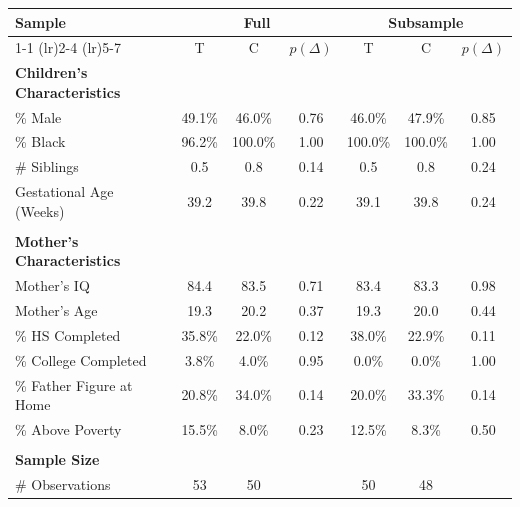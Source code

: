 \begin{tabular}{lcccccc}
\toprule 
\midrule 
Sample & \multicolumn{3}{c}{Full} & \multicolumn{3}{c}{Subsample} \\
 \cmidrule(lr){1-1} \cmidrule(lr){2-4} \cmidrule(lr){5-7} 
 & T & C & $p(\Delta)$ & T & C & $p(\Delta)$ \\
\midrule 
\textbf{Children's Characteristics} \\
\quad \% Male & 49.1\% & 46.0\% & 0.76 & 46.0\% & 47.9\% & 0.85 \\
\quad \% Black & 96.2\% & 100.0\% & 1.00 & 100.0\% & 100.0\% & 1.00 \\
\quad \# Siblings & 0.5 & 0.8 & 0.14 & 0.5 & 0.8 & 0.24 \\
\quad Gestational Age (Weeks) & 39.2 & 39.8 & 0.22 & 39.1 & 39.8 & 0.24 \\
 \\
\textbf{Mother's Characteristics} \\
\quad Mother's IQ & 84.4 & 83.5 & 0.71 & 83.4 & 83.3 & 0.98 \\
\quad Mother's Age & 19.3 & 20.2 & 0.37 & 19.3 & 20.0 & 0.44 \\
\quad \% HS Completed & 35.8\% & 22.0\% & 0.12 & 38.0\% & 22.9\% & 0.11 \\
\quad \% College Completed & 3.8\% & 4.0\% & 0.95 & 0.0\% & 0.0\% & 1.00 \\
\quad \% Father Figure at Home & 20.8\% & 34.0\% & 0.14 & 20.0\% & 33.3\% & 0.14 \\
\quad \% Above Poverty & 15.5\% & 8.0\% & 0.23 & 12.5\% & 8.3\% & 0.50 \\
 \\
\textbf{Sample Size} \\
\quad \# Observations & 53 & 50 &  & 50 & 48 &  \\
\midrule 
\bottomrule 
\end{tabular}
